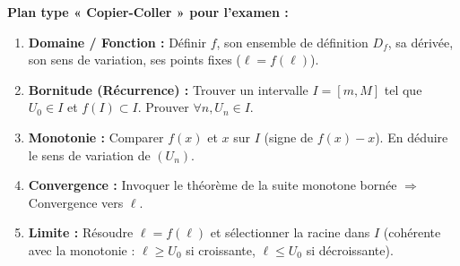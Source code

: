 \documentclass[11pt]{article}
\begin{document}
\begin{methode}[Étude complète d'une suite récurrente $U_{n+1}=f(U_n)$ : Algorithmique Probatoire]
    \textbf{Plan type « Copier-Coller » pour l'examen :}
    \begin{enumerate}
        \item \textbf{Domaine / Fonction :} Définir $f$, son ensemble de définition $D_f$, sa dérivée, son sens de variation, ses points fixes ($\ell = f(\ell)$).
        \item \textbf{Bornitude (Récurrence) :} Trouver un intervalle $I = [m, M]$ tel que $U_0 \in I$ et $f(I) \subset I$. Prouver $\forall n, U_n \in I$.
        \item \textbf{Monotonie :} Comparer $f(x)$ et $x$ sur $I$ (signe de $f(x)-x$). En déduire le sens de variation de $(U_n)$.
        \item \textbf{Convergence :} Invoquer le théorème de la suite monotone bornée $\Rightarrow$ Convergence vers $\ell$.
        \item \textbf{Limite :} Résoudre $\ell = f(\ell)$ et sélectionner la racine dans $I$ (cohérente avec la monotonie : $\ell \ge U_0$ si croissante, $\ell \le U_0$ si décroissante).
    \end{enumerate}
\end{methode}
\end{document}
